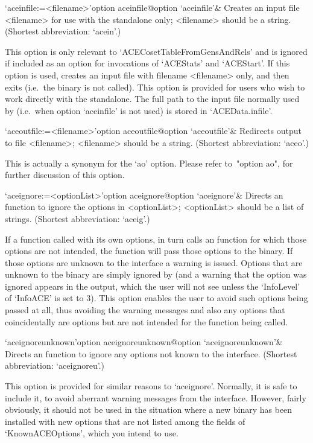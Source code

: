 \>`aceinfile:=<filename>'{option aceinfile}@{option `aceinfile'}&
Creates an {\ACE} input file <filename> for use  with  the  standalone
only; <filename> should be a string. (Shortest abbreviation: `acein'.)

This option is only relevant to `ACECosetTableFromGensAndRels' and  is
ignored if included as an option for  invocations  of  `ACEStats'  and
`ACEStart'. If this option is used, {\GAP} creates an input file  with
filename <filename> only, and then exits (i.e.~the  {\ACE}  binary  is
not called). This option is  provided  for  users  who  wish  to  work
directly with the {\ACE} standalone. The full path to the  input  file
normally used by {\ACE} (i.e.~when option `aceinfile' is not used)  is
stored in `ACEData.infile'.


\>`aceoutfile:=<filename>'{option aceoutfile}@{option `aceoutfile'}&
Redirects {\ACE} output to file <filename>;  <filename>  should  be  a
string. (Shortest abbreviation: `aceo'.)

This  is  actually  a  synonym  for  the  `ao'  option.  Please  refer
to~"option ao", for further discussion of this option.

\>`aceignore:=<optionList>'{option aceignore}@{option `aceignore'}&
Directs an {\ACE} function to  ignore  the  options  in  <optionList>;
<optionList> should be a list of strings.
(Shortest abbreviation: `aceig'.)

If a function called with its own options, in  turn  calls  an  {\ACE}
function for which those options are not intended, the {\ACE} function
will pass those options to the {\ACE} binary.  If  those  options  are
unknown to the {\ACE} interface a warning is issued. Options that  are
unknown to the {\ACE} binary are  simply  ignored  by  {\ACE}  (and  a
warning that the option was ignored  appears  in  the  {\ACE}  output,
which the user will not see unless the `InfoLevel' of `InfoACE' is set
to 3). This option enables the user to avoid such options being passed
at all, thus avoiding the warning messages and also any  options  that
coincidentally are {\ACE} options but are not intended for the  {\ACE}
function being called.

\>`aceignoreunknown'{option aceignoreunknown}@{option `aceignoreunknown'}&
Directs an {\ACE} function to  ignore  any  options  not known to the
{\ACE} interface.
(Shortest abbreviation: `aceignoreu'.)

This option is provided for similar reasons to `aceignore'.  Normally,
it is safe to include it, to avoid aberrant warning messages from  the
{\ACE} interface. However, fairly obviously, it should not be used  in
the situation where a new {\ACE} binary has been  installed  with  new
options that are not listed among  the  fields  of  `KnownACEOptions',
which you intend to use.

